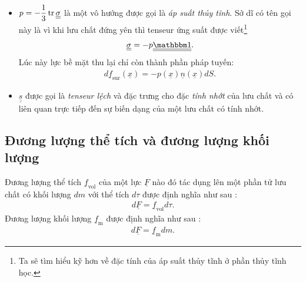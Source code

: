 \documentclass[../../../main.tex]{subfiles}
\begin{document}
		\begin{itemize}
			\item $p=-\dfrac{1}{3}\tr\underline{\underline{\sigma}}$ là một vô hướng được gọi là \emph{áp suất thủy tĩnh}. Sở dĩ có tên gọi này là vì khi lưu chất đứng yên thì tenseur ứng suất được viết\footnote{Ta sẽ tìm hiểu kỹ hơn về đặc tính của áp suất thủy tĩnh ở phần thủy tĩnh học.}
				\begin{align}
					\underline{\underline{\sigma}}=-p\underline{\underline{\mathbbm
					1}}.
				\end{align}
			Lúc này lực bề mặt thu lại chỉ còn thành phần pháp tuyến:
				\begin{align}
					d\underline{f}_{\text{sur}}\left(\underline{x}\right)=-p\left(\underline{x}\right)\underline{n}\left(\underline{x}\right)dS.
				\end{align}
			\item $\underline{\underline{s}}$ được gọi là \emph{tenseur lệch} và đặc trưng cho đặc \emph{tính nhớt} của lưu chất và có liên quan trực tiếp đến sự biến dạng của một lưu chất có tính nhớt.
		\end{itemize}
\subsection{Đương lượng thể tích và đương lượng khối lượng}
	
	Đương lượng thể tích $\underline{f}_{\text{vol}}$ của một lực $\underline{F}$ nào đó tác dụng lên một phần tử lưu chất có khối lượng $dm$ với thể tích $d\tau$ được định nghĩa như sau :
		\begin{equation}
			\begin{aligned}
				d\underline{F}=\underline{f}_{\text{vol}}d\tau.
			\end{aligned}
		\end{equation}
	Đương lượng khối lượng $\underline{f}_{\text{m}}$ được định nghĩa như sau :
		\begin{equation}
			\begin{aligned}
				d\underline{F}=\underline{f}_{\text{m}}dm.
			\end{aligned}
		\end{equation}
	
\end{document}
